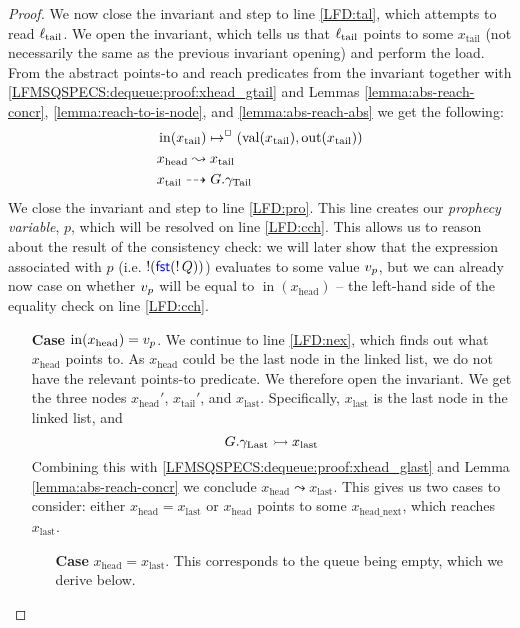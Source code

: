 \documentclass[a4paper, 10pt]{report}
\theoremstyle{definition}
\newcommand{\locN}[1]{\loc_{\mathrm{#1}}}
\newcommand{\loctail}{\locN{tail}}
\newcommand{\nIn}[1]{\operatorname{in}(#1)}
\newcommand{\nVal}[1]{\operatorname{val}(#1)}
\newcommand{\nOut}[1]{\operatorname{out}(#1)}
\newcommand{\node}{x}
\newcommand{\nodeN}[1]{\node_{\mathrm{#1}}}
\newcommand{\nodehead}{\nodeN{head}}
\newcommand{\nodetail}{\nodeN{tail}}
\newcommand{\nodelast}{\nodeN{last}}
\newcommand{\nodeheadnext}{\nodeN{head\_next}}
\newcommand{\prophval}{\val_p}
\newcommand{\Qg}{G}
\newcommand{\gtail}{\gname_{\mathrm{Tail}}}
\newcommand{\glast}{\gname_{\mathrm{Last}}}
\newcommand{\isNode}[1]{\nIn{#1} \mapsto^{\persistently} (\nVal{#1}, \nOut{#1})}
\newcommand{\reach}[2]{#1 \leadsto #2}
\newcommand{\ar}[2]{#1 \dashrightarrow #2}
\newcommand{\ap}[2]{#1 \rightarrowtail #2}
\begin{document}
\begin{proof}
  We now close the invariant and step to line \ref{LFD:tal}, which attempts to read $\loctail$. We open the invariant, which tells us that $\loctail$ points to some $\nodetail$ (not necessarily the same as the previous invariant opening) and perform the load. From the abstract points-to and reach predicates from the invariant together with \ref{LFMSQSPECS:dequeue:proof:xhead_gtail} and Lemmas \ref{lemma:abs-reach-concr}, \ref{lemma:reach-to-is-node}, and \ref{lemma:abs-reach-abs} we get the following:
  \begin{align}
    &\isNode{\nodetail}\label{LFMSQSPECS:dequeue:proof:xtail_node}\\
    &\reach{\nodehead}{\nodetail}\label{LFMSQSPECS:dequeue:proof:xhead_r_xtail}\\
    &\ar{\nodetail}{\Qg.\gtail}\label{LFMSQSPECS:dequeue:proof:xtail_gtail}\\
  \end{align}
  We close the invariant and step to line \ref{LFD:pro}. This line creates our \textit{prophecy variable}, $p$, which will be resolved on line \ref{LFD:cch}. This allows us to reason about the result of the consistency check: we will later show that the expression associated with $p$ (i.e. $\mathop{!}(\operatorname{\textsf{\color{blue} fst}} (\mathop{!} Q))$) evaluates to some value $\prophval$, but we can already now case on whether $\prophval$ will be equal to $\nIn{\nodehead}$ -- the left-hand side of the equality check on line \ref{LFD:cch}.
  \begin{itemize}
    \item[\textbf{Case}] $\nIn{\nodehead} = \prophval$.
    We continue to line \ref{LFD:nex}, which finds out what $\nodehead$ points to. As $\nodehead$ could be the last node in the linked list, we do not have the relevant points-to predicate. We therefore open the invariant. We get the three nodes $\nodehead'$, $\nodetail'$, and $\nodelast$. Specifically, $\nodelast$ is the last node in the linked list, and
    \begin{equation}\label{LFMSQSPECS:dequeue:proof:glast_xlast}
      \ap{\Qg.\glast}{\nodelast}
    \end{equation}
    Combining this with \ref{LFMSQSPECS:dequeue:proof:xhead_glast} and Lemma \ref{lemma:abs-reach-concr} we conclude $\reach{\nodehead}{\nodelast}$. This gives us two cases to consider: either $\nodehead = \nodelast$ or $\nodehead$ points to some $\nodeheadnext$, which reaches $\nodelast$.
    \begin{itemize}
      \item[\textbf{Case}] $\nodehead = \nodelast$. This corresponds to the queue being empty, which we derive below.\\

\end{itemize}
\end{itemize}
\end{proof}
\end{document}
